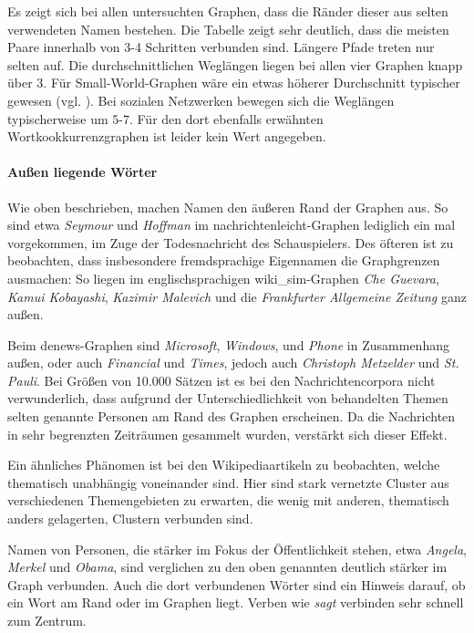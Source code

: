 \documentclass[11pt, a4paper]{article}
\begin{document}
Es zeigt sich bei allen untersuchten Graphen, dass die Ränder dieser aus selten verwendeten Namen bestehen.
Die Tabelle zeigt sehr deutlich, dass die meisten Paare innerhalb von 3-4 Schritten verbunden sind.
Längere Pfade treten nur selten auf.
Die durchschnittlichen Weglängen liegen bei allen vier Graphen knapp über 3.
Für Small-World-Graphen wäre ein etwas höherer Durchschnitt typischer gewesen (vgl. \cite{Newman2003}).
Bei sozialen Netzwerken bewegen sich die Weglängen typischerweise um $5$-$7$.
Für den dort ebenfalls erwähnten Wortkookkurrenzgraphen ist leider kein Wert angegeben.

\paragraph{Außen liegende Wörter}
Wie oben beschrieben, machen Namen den äußeren Rand der Graphen aus.
So sind etwa \emph{Seymour} und \emph{Hoffman} im nachrichtenleicht-Graphen lediglich ein mal vorgekommen, im Zuge der Todesnachricht des Schauspielers.
Des öfteren ist zu beobachten, dass insbesondere fremdsprachige Eigennamen die Graphgrenzen ausmachen:
So liegen im englischsprachigen wiki\_sim-Graphen \emph{Che Guevara}, \emph{Kamui Kobayashi}, \emph{Kazimir Malevich} und die \emph{Frankfurter Allgemeine Zeitung} ganz außen.

Beim denews-Graphen sind \emph{Microsoft}, \emph{Windows}, und \emph{Phone} in Zusammenhang außen, oder auch \emph{Financial} und \emph{Times}, jedoch auch \emph{Christoph Metzelder} und \emph{St. Pauli}.
Bei Größen von 10.000 Sätzen ist es bei den Nachrichtencorpora nicht verwunderlich, dass aufgrund der Unterschiedlichkeit von behandelten Themen selten genannte Personen am Rand des Graphen erscheinen.
Da die Nachrichten in sehr begrenzten Zeiträumen gesammelt wurden, verstärkt sich dieser Effekt.

Ein ähnliches Phänomen ist bei den Wikipediaartikeln zu beobachten, welche thematisch unabhängig voneinander sind.
Hier sind stark vernetzte Cluster aus verschiedenen Themengebieten zu erwarten, die wenig mit anderen, thematisch anders gelagerten, Clustern verbunden sind.

Namen von Personen, die stärker im Fokus der Öffentlichkeit stehen, etwa \emph{Angela}, \emph{Merkel} und \emph{Obama}, sind verglichen zu den oben genannten deutlich stärker im Graph verbunden.
Auch die dort verbundenen Wörter sind ein Hinweis darauf, ob ein Wort am Rand oder im Graphen liegt.
Verben wie \emph{sagt} verbinden sehr schnell zum Zentrum.
\end{document}
